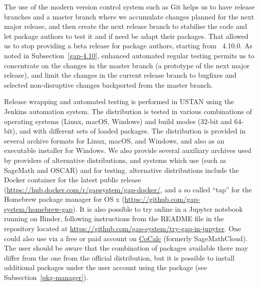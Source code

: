 The use of the modern version control system such as {\sf Git}
helps us to have release branches and a master branch
where we accumulate changes planned for the next major release, and then
create the next release branch to stabilise the code and let package
authors to test it and if need be adapt their packages. That allowed
us to stop providing a beta release for package authors, starting from
\GAP~4.10.0. As noted in Subsection~\ref{gap-4.10},
enhanced automated regular testing permits us to concentrate on 
the changes in the master branch (a prototype of the next major release), and limit 
the changes in the current release branch to bugfixes and selected 
non-disruptive changes backported from the master branch.

Release wrapping and automated testing is performed in USTAN
using the Jenkins automation system. The \GAP distribution is tested
in various combinations of operating systems (Linux, macOS, Windows)
and build modes (32-bit and 64-bit), and with different sets of
loaded packages.
The \GAP distribution is provided in several archive formats for
Linux, macOS, and Windows,
and also as an executable installer for Windows.
We also provide several auxiliary archives used by providers of alternative
distributions, and systems which use \GAP (such as SageMath and OSCAR)
and for testing.
\GAP alternative distributions include the Docker container for the 
latest public \GAP release (\url{https://hub.docker.com/r/gapsystem/gap-docker/},
and a so called ``tap'' for the Homebrew package manager for OS x
(\url{https://github.com/gap-system/homebrew-gap}). 
It is also possible to try \GAP online in a Jupyter notebook running 
on Binder, following instructions from the README file in the repository
located at \url{https://github.com/gap-system/try-gap-in-jupyter}.
One could also use \GAP via a free or paid account
on \href{https://cocalc.com/}{\sf CoCalc} (formerly SageMathCloud).
The user should be aware that the combination of \GAP packages 
available there may differ from the one from the official \GAP distribution,
but it is possible to install additional packages under the user account
using the  package (see Subsection~\ref{pkg-manager}).
